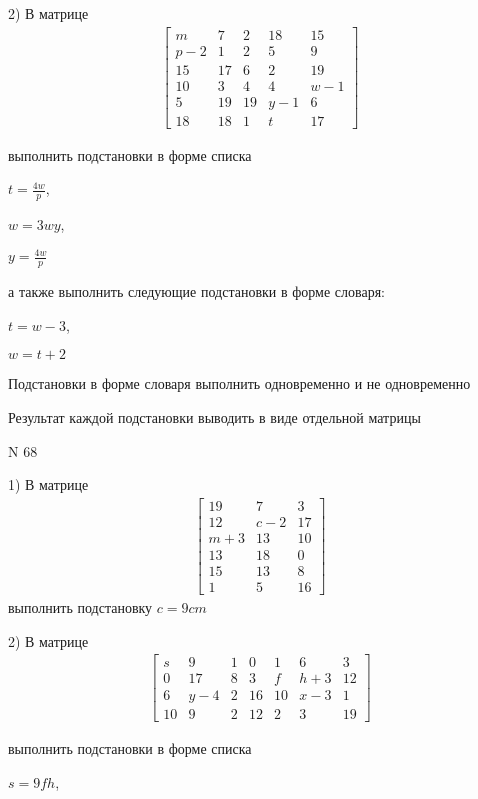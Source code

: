 \documentclass[11pt]{report}
\begin{document}
    2) В матрице
\begin{align*}
\left[\begin{matrix}m & 7 & 2 & 18 & 15\\p - 2 & 1 & 2 & 5 & 9\\15 & 17 & 6 & 2 & 19\\10 & 3 & 4 & 4 & w - 1\\5 & 19 & 19 & y - 1 & 6\\18 & 18 & 1 & t & 17\end{matrix}\right]
\end{align*}

выполнить подстановки в форме списка

$t=\frac{4 w}{p}$,

$w=3 w y$,

$y=\frac{4 w}{p}$

а также выполнить следующие подстановки в форме словаря:

$t=w - 3$,

$w=t + 2$


    Подстановки в форме словаря выполнить одновременно и не одновременно


    Результат каждой подстановки выводить в виде отдельной матрицы

\newpage
N 68


    1) В матрице
\begin{align*}
\left[\begin{matrix}19 & 7 & 3\\12 & c - 2 & 17\\m + 3 & 13 & 10\\13 & 18 & 0\\15 & 13 & 8\\1 & 5 & 16\end{matrix}\right]
\end{align*}
выполнить подстановку $c=9 c m$


    2) В матрице
\begin{align*}
\left[\begin{matrix}s & 9 & 1 & 0 & 1 & 6 & 3\\0 & 17 & 8 & 3 & f & h + 3 & 12\\6 & y - 4 & 2 & 16 & 10 & x - 3 & 1\\10 & 9 & 2 & 12 & 2 & 3 & 19\end{matrix}\right]
\end{align*}

выполнить подстановки в форме списка

$s=9 f h$,
\end{document}
